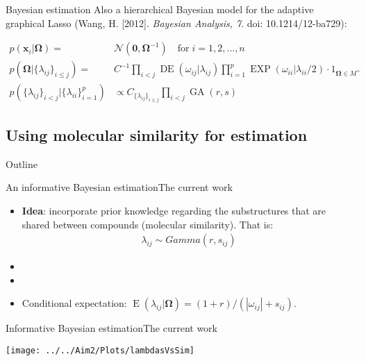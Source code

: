 \documentclass[xcolor=dvipsnames]{beamer}
\DeclareMathOperator{\EE}{E}
\DeclareMathOperator{\DE}{DE}
\DeclareMathOperator{\EXP}{EXP}
\DeclareMathOperator{\GA}{GA}
\begin{document}
\begin{frame}{Bayesian estimation}
	\vspace{-15.5pt}
	Also a hierarchical Bayesian model for the adaptive graphical Lasso (Wang, H. [2012]. \emph{Bayesian Analysis, 7}. doi: 10.1214/12-ba729):
	
	\begin{align*}
	p(\mathbf{x}_i|\boldsymbol{\Omega}) = & \mathcal{N}(\mathbf{0,\boldsymbol{\Omega}}^{-1}) \quad \text{for} \; i=1,2,\hdots,n\\
	p(\boldsymbol{\Omega}|\{\lambda_{ij}\}_{i\leq j}) = & C^{-1} \prod_{i<j} \DE(\omega_{ij}|\lambda_{ij}) \prod_{i=1}^{p} \EXP (\omega_{ii} | \lambda_{ii} / 2) \cdot 1_{\boldsymbol{\Omega}\in M^+}\\
	p(\{\lambda_{ij}\}_{i<j}|\{\lambda_{ii}\}_{i=1}^p) &\propto C_{\{\lambda_{ij}\}_{i\leq j}} \prod_{i<j} \GA(r,s)
	\end{align*}
\end{frame}

\subsection{Using molecular similarity for estimation}
\begin{frame}{Outline}
	\vspace{-10.5pt}
	\tableofcontents[currentsection,subsectionstyle=show/shaded/hide]
\end{frame}
\begin{frame}{An informative Bayesian estimation}{The current work}
	\vspace{-15.5pt}
	\begin{itemize}
		\item \textbf{Idea}:  incorporate prior knowledge regarding the substructures that are shared between compounds (molecular similarity). That is:
		\begin{align*}
			\lambda_{ij}\sim Gamma(r,s_{ij})
		\end{align*}\pause
		\item[]
		\item[]
		\item Conditional expectation: $\EE(\lambda_{ij}|\boldsymbol{\Omega})=(1+r)/(|\omega_{ij} |+s_{ij})$.
	\end{itemize}
\end{frame}

\begin{frame}{Informative Bayesian estimation}{The current work}
	\begin{center}
			\texttt{[image: ../../Aim2/Plots/lambdasVsSim]}
	\end{center}
\end{frame}
\end{document}
